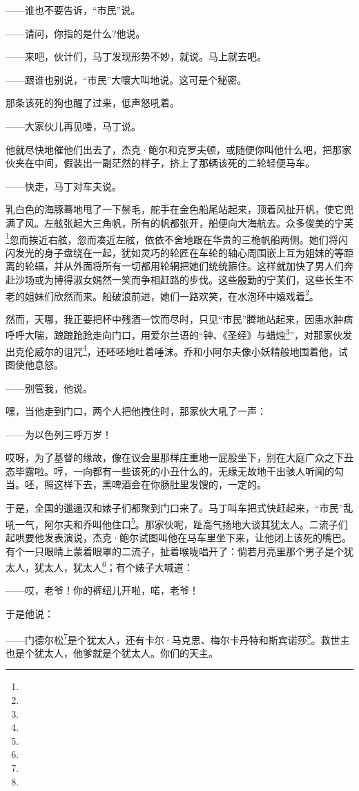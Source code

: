 \par ——谁也不要告诉，“市民”说。
\par ——请问，你指的是什么?他说。
\par ——来吧，伙计们，马丁发现形势不妙，就说。马上就去吧。
\par ——跟谁也别说，“市民”大嚷大叫地说。这可是个秘密。
\par 那条该死的狗也醒了过来，低声怒吼着。
\par ——大家伙儿再见喽，马丁说。
\par 他就尽快地催他们出去了，杰克·鲍尔和克罗夫顿，或随便你叫他什么吧，把那家伙夹在中间，假装出一副茫然的样子，挤上了那辆该死的二轮轻便马车。
\par ——快走，马丁对车夫说。
\par 乳白色的海豚蓦地甩了一下鬃毛，舵手在金色船尾站起来，顶着风扯开帆，使它兜满了风。左舷张起大三角帆，所有的帆都张开，船便向大海航去。众多俊美的宁芙\footnote{}忽而挨近右舷，忽而凑近左舷，依依不舍地跟在华贵的三桅帆船两侧。她们将闪闪发光的身子盘绕在一起，犹如灵巧的轮匠在车轮的轴心周围嵌上互为姐妹的等距离的轮辐，并从外面将所有一切都用轮辋把她们统统箍住。这样就加快了男人们奔赴沙场或为博得淑女嫣然一笑而争相赶路的步伐。这些殷勤的宁芙们，这些长生不老的姐妹们欣然而来。船破浪前进，她们一路欢笑，在水泡环中嬉戏着\footnote{}。
\par 然而，天哪，我正要把杯中残酒一饮而尽时，只见“市民”腾地站起来，因患水肿病呼呼大喘，踉踉跄跄走向门口，用爱尔兰语的“钟、《圣经》与蜡烛\footnote{}”，对那家伙发出克伦威尔的诅咒\footnote{}，还呸呸地吐着唾沫。乔和小阿尔夫像小妖精般地围着他，试图使他息怒。
\par ——别管我，他说。
\par 嘿，当他走到门口，两个人把他拽住时，那家伙大吼了一声：
\par ——为以色列三呼万岁！
\par 哎呀，为了基督的缘故，像在议会里那样庄重地一屁股坐下，别在大庭广众之下丑态毕露啦。哼，一向都有一些该死的小丑什么的，无缘无故地干出骇人听闻的勾当。呸，照这样下去，黑啤酒会在你肠肚里发馊的，一定的。
\par 于是，全国的邋遢汉和婊子们都聚到门口来了。马丁叫车把式快赶起来，“市民”乱吼一气，阿尔夫和乔叫他住口\footnote{}。那家伙呢，趾高气扬地大谈其犹太人。二流子们起哄要他发表演说，杰克·鲍尔试图叫他在马车里坐下来，让他闭上该死的嘴巴。有个一只眼睛上蒙着眼罩的二流子，扯着喉咙唱开了：倘若月亮里那个男子是个犹太人，犹太人，犹太人\footnote{}；有个婊子大喊道：
\par ——哎，老爷！你的裤纽儿开啦，喏，老爷！
\par 于是他说：
\par ——门德尔松\footnote{}是个犹太人，还有卡尔·马克思、梅尔卡丹特和斯宾诺莎\footnote{}。救世主也是个犹太人，他爹就是个犹太人。你们的天主。
